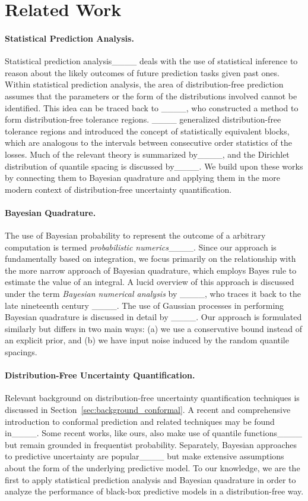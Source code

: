\section{Related Work}
\paragraph{Statistical Prediction Analysis.} Statistical prediction analysis____ deals with the use of statistical inference to reason about the likely outcomes of future prediction tasks given past ones. Within statistical prediction analysis, the area of distribution-free prediction assumes that the parameters or the form of the distributions involved cannot be identified. This idea can be traced back to ____, who constructed a method to form distribution-free tolerance regions. ____ generalized distribution-free tolerance regions and introduced the concept of statistically equivalent blocks, which are analogous to the intervals between consecutive order statistics of the losses. Much of the relevant theory is summarized by____, and the Dirichlet distribution of quantile spacing is discussed by____. We build upon these works by connecting them to Bayesian quadrature and applying them in the more modern context of distribution-free uncertainty quantification.

\paragraph{Bayesian Quadrature.} The use of Bayesian probability to represent the outcome of a arbitrary computation is termed \emph{probabilistic numerics}____. Since our approach is fundamentally based on integration, we focus primarily on the relationship with the more narrow approach of Bayesian quadrature, which employs Bayes rule to estimate the value of an integral. A lucid overview of this approach is discussed under the term \emph{Bayesian numerical analysis} by ____, who traces it back to the late nineteenth century ____. The use of Gaussian processes in performing Bayesian quadrature is discussed in detail by ____. Our approach is formulated similarly but differs in two main ways: (a) we use a conservative bound instead of an explicit prior, and (b) we have input noise induced by the random quantile spacings.

\paragraph{Distribution-Free Uncertainty Quantification.}
Relevant background on distribution-free uncertainty quantification techniques is discussed in Section~\ref{sec:background_conformal}. A recent and comprehensive introduction to conformal prediction and related techniques may be found in____. Some recent works, like ours, also make use of quantile functions____ but remain grounded in frequentist probability.  Separately, Bayesian approaches to predictive uncertainty are popular____ but make extensive assumptions about the form of the underlying predictive model. To our knowledge, we are the first to apply statistical prediction analysis and Bayesian quadrature in order to analyze the performance of black-box predictive models in a distribution-free way.